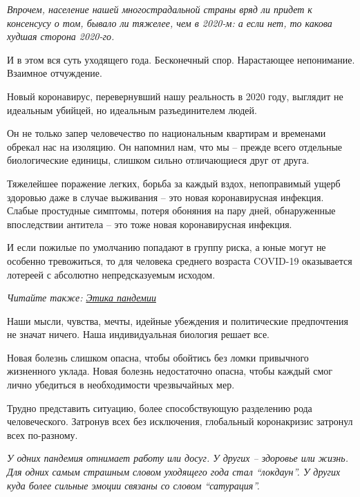 \begin{leftbar}
	\begingroup
		\em Впрочем, население нашей многострадальной страны вряд ли придет к
				консенсусу о том, бывало ли тяжелее, чем в 2020-м: а если нет, то
				какова худшая сторона 2020-го.
	\endgroup
\end{leftbar}

И в этом вся суть уходящего года. Бесконечный спор. Нарастающее непонимание.
Взаимное отчуждение.

Новый коронавирус, перевернувший нашу реальность в 2020 году, выглядит не
идеальным убийцей, но идеальным разъединителем людей.

Он не только запер человечество по национальным квартирам и временами обрекал
нас на изоляцию. Он напомнил нам, что мы – прежде всего отдельные биологические
единицы, слишком сильно отличающиеся друг от друга.

Тяжелейшее поражение легких, борьба за каждый вздох, непоправимый ущерб
здоровью даже в случае выживания – это новая коронавирусная инфекция. Слабые
простудные симптомы, потеря обоняния на пару дней, обнаруженные впоследствии
антитела – это тоже новая коронавирусная инфекция.

И если пожилые по умолчанию попадают в группу риска, а юные могут не особенно
тревожиться, то для человека среднего возраста COVID-19 оказывается лотереей с
абсолютно непредсказуемым исходом.

\begin{leftbar}
	\begingroup
		\em Читайте также: \href{https://www.pravda.com.ua/rus/articles/2020/11/21/7274195/}{Этика пандемии}
	\endgroup
\end{leftbar}

Наши мысли, чувства, мечты, идейные убеждения и политические предпочтения не
значат ничего. Наша индивидуальная биология решает все.

Новая болезнь слишком опасна, чтобы обойтись без ломки привычного жизненного
уклада. Новая болезнь недостаточно опасна, чтобы каждый смог лично убедиться в
необходимости чрезвычайных мер.

Трудно представить ситуацию, более способствующую разделению рода
человеческого. Затронув всех без исключения, глобальный коронакризис затронул
всех по-разному.

\begin{leftbar}
	\begingroup
		\em У  одних пандемия отнимает работу или досуг. У других – здоровье или
				жизнь. Для одних самым страшным словом уходящего года стал \enquote{локдаун}. У
				других куда более сильные эмоции связаны со словом \enquote{сатурация}.
	\endgroup
\end{leftbar}

